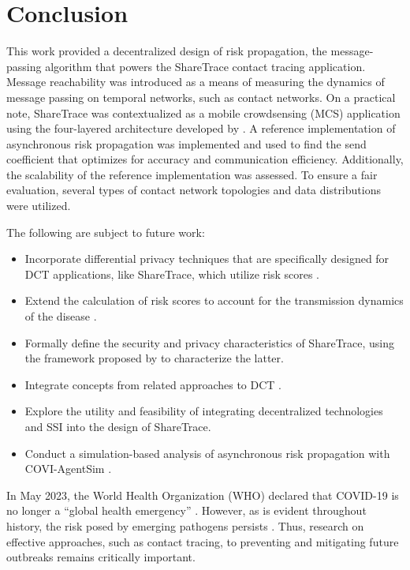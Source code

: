 \chapter{Conclusion}\label{ch:conclusion}

This work provided a decentralized design of risk propagation, the message-passing algorithm that powers the ShareTrace contact tracing application. Message reachability was introduced as a means of measuring the dynamics of message passing on temporal networks, such as contact networks. On a practical note, ShareTrace was contextualized as a mobile crowdsensing (MCS) application using the four-layered architecture developed by \citet{Capponi2019}. A reference implementation of asynchronous risk propagation was implemented and used to find the send coefficient that optimizes for accuracy and communication efficiency. Additionally, the scalability of the reference implementation was assessed. To ensure a fair evaluation, several types of contact network topologies and data distributions were utilized.

The following are subject to future work:
\begin{itemize}
  \item Incorporate differential privacy techniques that are specifically designed for DCT applications, like ShareTrace, which utilize risk scores \citep{Romijnders2024}.
  \item Extend the calculation of risk scores to account for the transmission dynamics of the disease \citep{Ferretti2020, Ferretti2024}.
  \item Formally define the security and privacy characteristics of ShareTrace, using the framework proposed by \citet{Kuhn2021} to characterize the latter.
  \item Integrate concepts from related approaches to DCT \citep{Reichert2020, Cho2020, Cherini2023, Gupta2023}.
  \item Explore the utility and feasibility of integrating decentralized technologies \citep{Benet2014, Troncoso2017, Trautwein2022, Shi2024, Keizer2024} and SSI \citep{Preukschat2021, Schardong2022} into the design of ShareTrace.
  \item Conduct a simulation-based analysis of asynchronous risk propagation with COVI-AgentSim \citep{Gupta2020}.
\end{itemize}

In May 2023, the World Health Organization (WHO) declared that COVID-19 is no longer a ``global health emergency'' \citep{Wise2023}. However, as is evident throughout history, the risk posed by emerging pathogens persists \citep{Piret2021, Tabish2022}. Thus, research on effective approaches, such as contact tracing, to preventing and mitigating future outbreaks remains critically important.